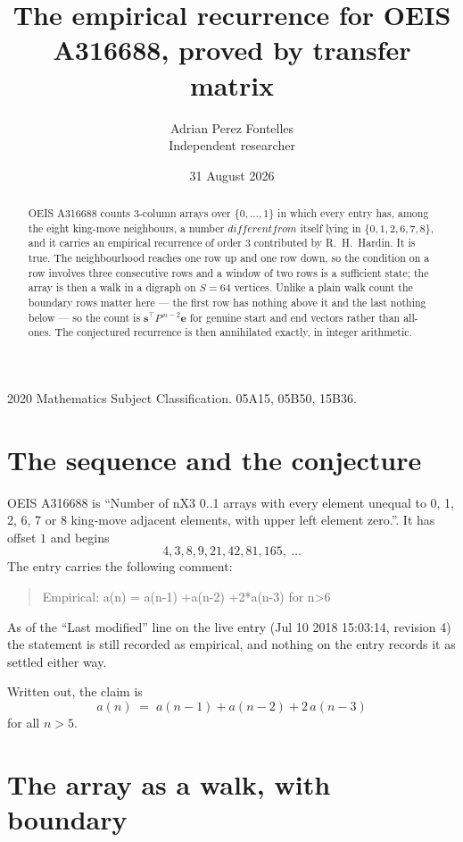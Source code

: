 \documentclass[11pt,a4paper]{article}
\title{The empirical recurrence for OEIS A316688, proved by transfer matrix}
\author{Adrian Perez Fontelles\\ \small Independent researcher}
\date{31 August 2026}
\theoremstyle{plain}
\theoremstyle{definition}
\begin{document}
\maketitle

\begin{abstract}
OEIS A316688 counts $3$-column arrays over $\{0,\dots,1\}$ in which every entry has,
among the eight king-move neighbours, a number $different from$ itself lying in $\{0,1,2,6,7,8\}$, and it carries an empirical
recurrence of order $3$ contributed by R.~H.~Hardin. It is true. The neighbourhood
reaches one row up and one row down, so the condition on a row involves three consecutive
rows and a window of two rows is a sufficient state; the array is then a walk in a digraph
on $S=64$ vertices. Unlike a plain walk count the boundary rows matter here --- the first
row has nothing above it and the last nothing below --- so the count is
$\mathbf{s}^{\!\top}P^{\,n-2}\mathbf{e}$ for genuine start and end vectors rather than
all-ones. The conjectured recurrence is then annihilated exactly, in integer arithmetic.
\end{abstract}

\noindent\small 2020 Mathematics Subject Classification. 05A15, 05B50, 15B36.\normalsize

\section{The sequence and the conjecture}

OEIS A316688 is ``Number of nX3 0..1 arrays with every element unequal to 0, 1, 2, 6, 7 or 8 king-move adjacent elements, with upper left element zero.''. It has offset
$1$ and begins
\[
4, 3, 8, 9, 21, 42, 81, 165,\ \dots
\]
The entry carries the following comment:
\begin{quote}\small
Empirical: a(n) = a(n-1) +a(n-2) +2*a(n-3) for n>6
\end{quote}
As of the ``Last modified'' line on the live entry (Jul 10 2018 15:03:14, revision
4) the statement is still recorded as empirical, and nothing on the entry
records it as settled either way.

Written out, the claim is
\begin{equation}\label{eq:conj}
a(n)\;=\;a(n-1) + a(n-2) + 2\,a(n-3)
\end{equation}
for all $n>5$.

\section{The array as a walk, with boundary}
\end{document}
